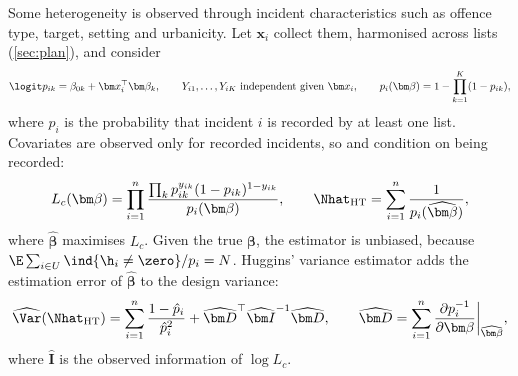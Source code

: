 Some heterogeneity is observed through incident characteristics such as offence type, target, setting and urbanicity. Let $\bm x_i$ collect them, harmonised across lists (\cref{sec:plan}), and consider
\begin{equation}\label{eq:models-huggins}
  \logit p_{ik}=\beta_{0k}+\bm x_i^{\top}\bm\beta_k,\qquad
  Y_{i1},\dots,Y_{iK}\ \text{independent given }\bm x_i,
  \qquad p_i(\bm\beta)=1-\prod_{k=1}^{K}(1-p_{ik}),
\end{equation}
where $p_i$ is the probability that incident $i$ is recorded by at least one list. Covariates are observed only for recorded incidents, so \citet{huggins1989} and \citet{alho1990} condition on being recorded:
\begin{equation}\label{eq:models-ht}
  L_c(\bm\beta)=\prod_{i=1}^{n}\frac{\prod_{k}p_{ik}^{y_{ik}}(1-p_{ik})^{1-y_{ik}}}{p_i(\bm\beta)},
  \qquad
  \Nhat_{\mathrm{HT}}=\sum_{i=1}^{n}\frac{1}{p_i(\widehat{\bm\beta})},
\end{equation}
where $\widehat{\bm\beta}$ maximises $L_c$. Given the true $\bm\beta$, the estimator is unbiased, because $\E\sum_{i\in U}\ind{\h_i\ne\zero}/p_i=N$. Huggins' variance estimator adds the estimation error of $\widehat{\bm\beta}$ to the design variance:
\begin{equation}\label{eq:models-hugvar}
  \widehat{\Var}(\Nhat_{\mathrm{HT}})=\sum_{i=1}^{n}\frac{1-\hat p_i}{\hat p_i^{2}}+\widehat{\bm D}^{\top}\widehat{\bm I}^{-1}\widehat{\bm D},
  \qquad
  \widehat{\bm D}=\sum_{i=1}^{n}\frac{\partial p_i^{-1}}{\partial\bm\beta}\bigg|_{\widehat{\bm\beta}},
\end{equation}
where $\widehat{\bm I}$ is the observed information of $\log L_c$.

